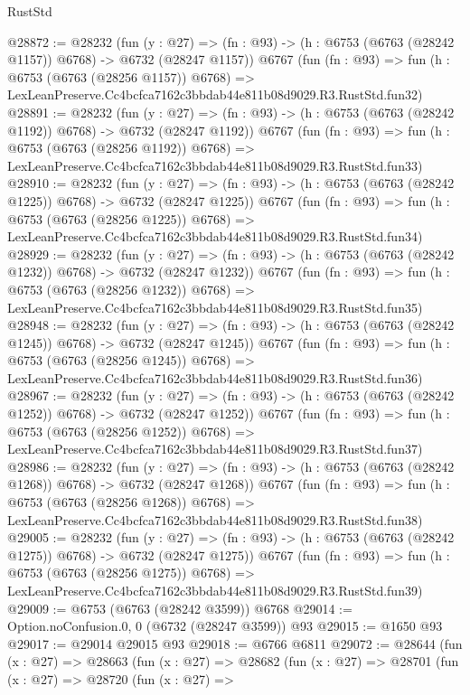 \begin{lexlean}{RustStd}
\begin{coremodule}
@28872 := @28232
    (fun (y : @27) =>
    (fn : @93) -> (h : @6753 (@6763 (@28242 @1157)) @6768) -> @6732 (@28247 @1157))
    @6767
    (fun (fn : @93) =>
    fun (h : @6753 (@6763 (@28256 @1157)) @6768) =>
    LexLeanPreserve.Cc4bcfca7162c3bbdab44e811b08d9029.R3.RustStd.fun32)
@28891 := @28232
    (fun (y : @27) =>
    (fn : @93) -> (h : @6753 (@6763 (@28242 @1192)) @6768) -> @6732 (@28247 @1192))
    @6767
    (fun (fn : @93) =>
    fun (h : @6753 (@6763 (@28256 @1192)) @6768) =>
    LexLeanPreserve.Cc4bcfca7162c3bbdab44e811b08d9029.R3.RustStd.fun33)
@28910 := @28232
    (fun (y : @27) =>
    (fn : @93) -> (h : @6753 (@6763 (@28242 @1225)) @6768) -> @6732 (@28247 @1225))
    @6767
    (fun (fn : @93) =>
    fun (h : @6753 (@6763 (@28256 @1225)) @6768) =>
    LexLeanPreserve.Cc4bcfca7162c3bbdab44e811b08d9029.R3.RustStd.fun34)
@28929 := @28232
    (fun (y : @27) =>
    (fn : @93) -> (h : @6753 (@6763 (@28242 @1232)) @6768) -> @6732 (@28247 @1232))
    @6767
    (fun (fn : @93) =>
    fun (h : @6753 (@6763 (@28256 @1232)) @6768) =>
    LexLeanPreserve.Cc4bcfca7162c3bbdab44e811b08d9029.R3.RustStd.fun35)
@28948 := @28232
    (fun (y : @27) =>
    (fn : @93) -> (h : @6753 (@6763 (@28242 @1245)) @6768) -> @6732 (@28247 @1245))
    @6767
    (fun (fn : @93) =>
    fun (h : @6753 (@6763 (@28256 @1245)) @6768) =>
    LexLeanPreserve.Cc4bcfca7162c3bbdab44e811b08d9029.R3.RustStd.fun36)
@28967 := @28232
    (fun (y : @27) =>
    (fn : @93) -> (h : @6753 (@6763 (@28242 @1252)) @6768) -> @6732 (@28247 @1252))
    @6767
    (fun (fn : @93) =>
    fun (h : @6753 (@6763 (@28256 @1252)) @6768) =>
    LexLeanPreserve.Cc4bcfca7162c3bbdab44e811b08d9029.R3.RustStd.fun37)
@28986 := @28232
    (fun (y : @27) =>
    (fn : @93) -> (h : @6753 (@6763 (@28242 @1268)) @6768) -> @6732 (@28247 @1268))
    @6767
    (fun (fn : @93) =>
    fun (h : @6753 (@6763 (@28256 @1268)) @6768) =>
    LexLeanPreserve.Cc4bcfca7162c3bbdab44e811b08d9029.R3.RustStd.fun38)
@29005 := @28232
    (fun (y : @27) =>
    (fn : @93) -> (h : @6753 (@6763 (@28242 @1275)) @6768) -> @6732 (@28247 @1275))
    @6767
    (fun (fn : @93) =>
    fun (h : @6753 (@6763 (@28256 @1275)) @6768) =>
    LexLeanPreserve.Cc4bcfca7162c3bbdab44e811b08d9029.R3.RustStd.fun39)
@29009 := @6753 (@6763 (@28242 @3599)) @6768
@29014 := Option.noConfusion.{0, 0} (@6732 (@28247 @3599)) @93
@29015 := @1650 @93
@29017 := @29014 @29015 @93
@29018 := @6766 @6811
@29072 := @28644
    (fun (x : @27) =>
    @28663
      (fun (x : @27) =>
      @28682
        (fun (x : @27) =>
        @28701
          (fun (x : @27) =>
          @28720
            (fun (x : @27) =>

\end{coremodule}
\end{lexlean}
